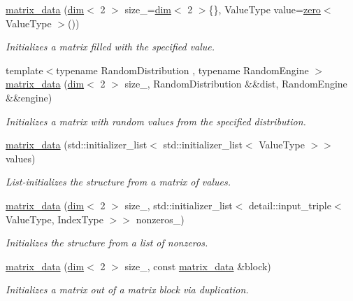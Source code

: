 \begin{DoxyCompactItemize}
\item 
\hyperlink{structgko_1_1matrix__data_a4be80a4afbd7f905aa4e73fbeb9df762}{matrix\+\_\+data} (\hyperlink{structgko_1_1dim}{dim}$<$ 2 $>$ size\+\_\+=\hyperlink{structgko_1_1dim}{dim}$<$ 2 $>$\{\}, Value\+Type value=\hyperlink{namespacegko_a70dbe01ff95c7b953d3d737424c6feb5}{zero}$<$ Value\+Type $>$())
\begin{DoxyCompactList}\small\item\em Initializes a matrix filled with the specified value. \end{DoxyCompactList}\item 
{\footnotesize template$<$typename Random\+Distribution , typename Random\+Engine $>$ }\\\hyperlink{structgko_1_1matrix__data_aea89944190aba3ace872bf31fd98fd3d}{matrix\+\_\+data} (\hyperlink{structgko_1_1dim}{dim}$<$ 2 $>$ size\+\_\+, Random\+Distribution \&\&dist, Random\+Engine \&\&engine)
\begin{DoxyCompactList}\small\item\em Initializes a matrix with random values from the specified distribution. \end{DoxyCompactList}\item 
\hyperlink{structgko_1_1matrix__data_adbba515151de75a490c3fb66cc56bc82}{matrix\+\_\+data} (std\+::initializer\+\_\+list$<$ std\+::initializer\+\_\+list$<$ Value\+Type $>$$>$ values)
\begin{DoxyCompactList}\small\item\em List-\/initializes the structure from a matrix of values. \end{DoxyCompactList}\item 
\hyperlink{structgko_1_1matrix__data_a80074a1ab496f2332b126407de533e76}{matrix\+\_\+data} (\hyperlink{structgko_1_1dim}{dim}$<$ 2 $>$ size\+\_\+, std\+::initializer\+\_\+list$<$ detail\+::input\+\_\+triple$<$ Value\+Type, Index\+Type $>$$>$ nonzeros\+\_\+)
\begin{DoxyCompactList}\small\item\em Initializes the structure from a list of nonzeros. \end{DoxyCompactList}\item 
\hyperlink{structgko_1_1matrix__data_aa8398ce720b3db2ebde137419d032352}{matrix\+\_\+data} (\hyperlink{structgko_1_1dim}{dim}$<$ 2 $>$ size\+\_\+, const \hyperlink{structgko_1_1matrix__data}{matrix\+\_\+data} \&block)
\begin{DoxyCompactList}\small\item\em Initializes a matrix out of a matrix block via duplication. \end{DoxyCompactList}\item 

\end{DoxyCompactItemize}
